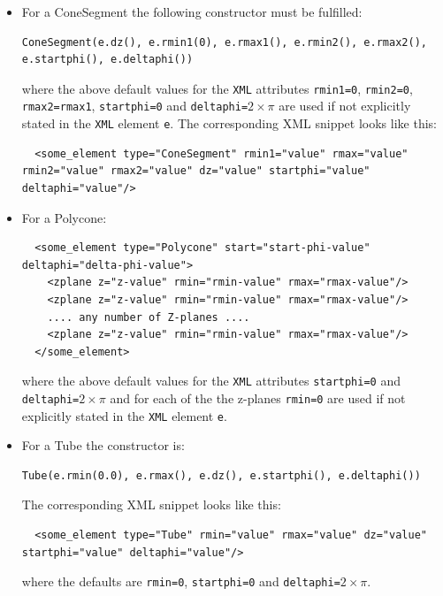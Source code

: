 \begin{itemize}
\item For a ConeSegment the following constructor must be fulfilled: 
\begin{verbatim}
ConeSegment(e.dz(), e.rmin1(0), e.rmax1(), e.rmin2(), e.rmax2(), e.startphi(), e.deltaphi())
\end{verbatim}
where the above default values for the \texttt{XML} attributes \texttt{rmin1=0}, \texttt{rmin2=0},
\texttt{rmax2=rmax1}, \texttt{startphi=0} and \texttt{deltaphi=$2\times\pi$}
are used if not explicitly stated in the \texttt{XML} element \texttt{e}.
The corresponding XML snippet looks like this:
\begin{verbatim}
  <some_element type="ConeSegment" rmin1="value" rmax="value" rmin2="value" rmax2="value" dz="value" startphi="value" deltaphi="value"/>
\end{verbatim}

\item For a Polycone:
\vspace{-0.2cm}
\begin{verbatim}
  <some_element type="Polycone" start="start-phi-value" deltaphi="delta-phi-value">
    <zplane z="z-value" rmin="rmin-value" rmax="rmax-value"/>
    <zplane z="z-value" rmin="rmin-value" rmax="rmax-value"/>
    .... any number of Z-planes ....
    <zplane z="z-value" rmin="rmin-value" rmax="rmax-value"/>
  </some_element>
\end{verbatim}
where the above default values for the \texttt{XML} attributes \texttt{startphi=0} and
\texttt{deltaphi=$2\times\pi$} and for each of the the z-planes \texttt{rmin=0}
are used if not explicitly stated in the \texttt{XML} element \texttt{e}.

\item For a Tube the constructor is:
\begin{verbatim}
Tube(e.rmin(0.0), e.rmax(), e.dz(), e.startphi(), e.deltaphi())
\end{verbatim}
The corresponding XML snippet looks like this:
\begin{verbatim}
  <some_element type="Tube" rmin="value" rmax="value" dz="value" startphi="value" deltaphi="value"/>
\end{verbatim}
where the defaults are \texttt{rmin=0}, \texttt{startphi=0} and \texttt{deltaphi=$2\times\pi$}.


\end{itemize}
